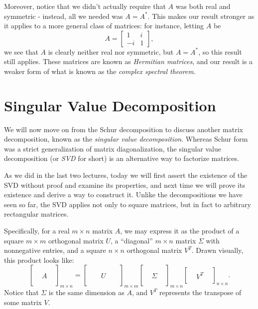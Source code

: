\documentclass[letterpaper]{article}
\theoremstyle{remark}
\newcommand{\mat}[1]{\ensuremath{\begin{bmatrix}#1\end{bmatrix}}}
\begin{document}
Moreover, notice that we didn't actually require that $A$ was both real and symmetric - instead, all we needed was $A = A^*$. This makes our result stronger as it applies to a more general class of matrices: for instance, letting $A$ be
\[
    A = \mat{1 & i \\ -i & 1},
\]
we see that $A$ is clearly neither real nor symmetric, but $A = A^*$, so this result still applies. These matrices are known as \emph{Hermitian matrices}, and our result is a weaker form of what is known as the \emph{complex spectral theorem}.

\section{Singular Value Decomposition}
We will now move on from the Schur decomposition to discuss another matrix decomposition, known as the \emph{singular value decomposition}. Whereas Schur form was a strict generalization of matrix diagonalization, the singular value decomposition (or \emph{SVD} for short) is an alternative way to factorize matrices.

As we did in the last two lectures, today we will first assert the existence of the SVD without proof and examine its properties, and next time we will prove its existence and derive a way to construct it. Unlike the decompositions we have seen so far, the SVD applies not only to square matrices, but in fact to arbitrary rectangular matrices.

Specifically, for a real $m \times n$ matrix $A$, we may express it as the product of a square $m \times m$ orthogonal matrix $U$, a ``diagonal'' $m \times n$ matrix $\Sigma$ with nonnegative entries, and a square $n \times n$ orthogonal matrix $V^T$. Drawn visually, this product looks like:
\[
    \mat{\\ \\ & A & \\ \\ &}_{m \times n} = \mat{\\ \\ & & U & & \\ \\ &}_{m \times m} \mat{\\ \\ & \Sigma & \\ \\ &}_{m \times n} \mat{\\ & V^T & \\ &}_{n \times n}.
\]
Notice that $\Sigma$ is the same dimension as $A$, and $V^T$ represents the transpose of some matrix $V$.
\end{document}
